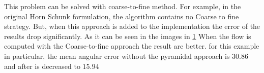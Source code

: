 \documentclass[12pt,a4paper,twoside]{report}
\begin{document}
{This problem can be solved with coarse-to-fine method.
For example, in the original Horn Schunk formulation, the algorithm contains no Coarse to fine strategy. But, when this approach is added to the implementation the error of the results drop significantly. As it can be seen in the images in \ref{HSExample} When the flow is computed with the Coarse-to-fine approach the result are better. for this example in particular, the mean angular error without the pyramidal approach is $30.86$ and after is decreased to $15.94$





\begin{figure} \label{HSExample}
	\\

\end{figure}}
\end{document}
